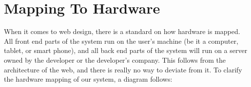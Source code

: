 \section{Mapping To Hardware}
When it comes to web design, there is a standard on how hardware is mapped. All front end parts of the system run on the user's machine (be it a computer, tablet, or smart phone), and all back end parts of the system will run on a server owned by the developer or the developer's company. This follows from the architecture of the web, and there is really no way to deviate from it. To clarify the hardware mapping of our system, a diagram follows:

